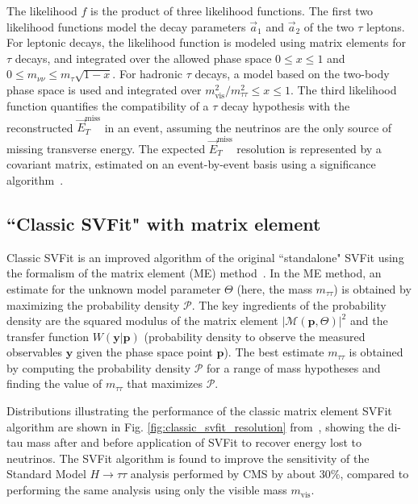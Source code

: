 The likelihood $f$ is the product of three likelihood functions. The first two likelihood functions model the decay parameters $\vec{a}_1$ and $\vec{a}_2$ of the two $\tau$ leptons. For leptonic decays, the likelihood function is modeled using matrix elements for $\tau$ decays, and integrated over the allowed phase space $0 \leq x \leq 1$ and $0 \leq m_{\nu\nu} \leq m_{\tau} \sqrt{1-x}$. For hadronic $\tau$ decays, a model based on the two-body phase space is used and integrated over $m_{\text{vis}}^2/ m_{\tau\tau}^2 \leq x \leq 1$. The third likelihood function quantifies the compatibility of a $\tau$ decay hypothesis with the reconstructed $\vec{E}_{T}^{\text{miss}}$ in an event, assuming the neutrinos are the only source of missing transverse energy. The expected $\vec{E}_{T}^{\text{miss}}$ resolution is represented by a covariant matrix, estimated on an event-by-event basis using a significance algorithm~\cite{CMS-JME-10-009}.

\subsection{\texorpdfstring{``Classic SVFit"}{"Classic SVFit} with matrix element}
Classic SVFit is an improved algorithm of the original ``standalone" SVFit using the formalism of the matrix element (ME) method~\cite{2014_SVFit_Bianchini}. In the ME method, an estimate for the unknown model parameter $\Theta$ (here, the mass $m_{\tau\tau}$) is obtained by maximizing the probability density $\mathcal{P}$. The key ingredients of the probability density are the squared modulus of the matrix element $|\mathcal{M}(\mathbf{p}, \Theta)|^2$ and the transfer function $W(\mathbf{y}|\mathbf{p})$ (probability density to observe the measured observables $\mathbf{y}$ given the phase space point $\mathbf{p}$). The best estimate $m_{\tau\tau}$ is obtained by computing the probability density $\mathcal{P}$ for a range of mass hypotheses and finding the value of $m_{\tau\tau}$ that maximizes $\mathcal{P}$.

Distributions illustrating the performance of the classic matrix element SVFit algorithm are shown in Fig. \ref{fig:classic_svfit_resolution} from~\cite{2014_SVFit_Bianchini}, showing the di-tau mass after and before application of SVFit to recover energy lost to neutrinos. The SVFit algorithm is found to improve the sensitivity of the Standard Model $H \rightarrow \tau\tau$ analysis performed by CMS by about 30\%, compared to performing the same analysis using only the visible mass $m_{\text{vis}}$. 


